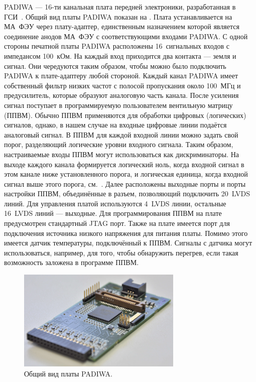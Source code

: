 PADIWA --- 16-ти канальная плата передней электроники, разработанная в ГСИ~\cite{TRBSITE}. Общий вид платы PADIWA показан на . Плата устанавливается на МА~ФЭУ через плату-адаптер, единственным назначением которой является соединение анодов МА~ФЭУ с соответствующими входами PADIWA. С одной стороны печатной платы PADIWA расположены 16~сигнальных входов с импедансом 100~кОм. На каждый вход приходится два контакта --- земля и сигнал. Они чередуются таким образом, чтобы можно было подключить PADIWA к плате-адаптеру любой стороной. Каждый канал PADIWA имеет собственный фильтр низких частот с полосой пропускания около 100~МГц и предусилитель, которые образуют аналоговую часть канала. После усиления сигнал поступает в программируемую пользователем вентильную матрицу (ППВМ). Обычно ППВМ применяются для обработки цифровых (логических) сигналов, однако, в нашем случае на входные цифровые линии подаётся аналоговый сигнал. В ППВМ для каждой входной линии можно задать свой порог, разделяющий логические уровни входного сигнала. Таким образом, настраиваемые входы ППВМ могут использоваться как дискриминаторы. На выходе каждого канала формируется логический ноль, когда входной сигнал в этом канале ниже установленного порога, и логическая единица, когда входной сигнал выше этого порога, см.~. Далее расположены выходные порты и порты настройки ППВМ, объединённые в разъем, позволяющий подключить 20~LVDS линий. Для управления платой используются 4~LVDS линии, остальные 16~LVDS линий --- выходные. Для программирования ППВМ на плате предусмотрен стандартный JTAG порт. Также на плате имеется порт для подключения источника низкого напряжения для питания платы. Помимо этого имеется датчик температуры, подключённый к ППВМ. Сигналы с датчика могут использоваться, например, для того, чтобы обнаружить перегрев, если такая возможность заложена в программе ППВМ.

\begin{figure}[H]
\centering
\includegraphics[width=0.7\textwidth]{pictures/5_padiwa_lowres.jpg}
\caption{Общий вид платы PADIWA.}
\label{fig:PADIWA}
\end{figure}

